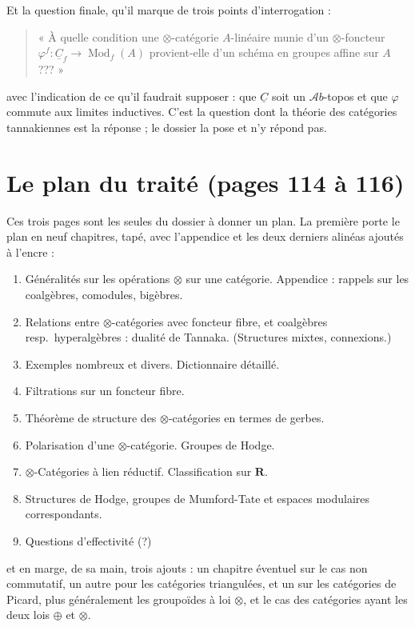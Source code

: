 \documentclass[11pt,a4paper]{article}
\begin{document}
Et la question finale, qu'il marque de trois points d'interrogation :
\begin{quote}
« À quelle condition une $\otimes$-catégorie $A$-linéaire munie d'un
$\otimes$-foncteur $\varphi^{f} \colon \underline{C}_{f} \to
\operatorname{Mod}_{f}(A)$ provient-elle d'un schéma en groupes affine sur $A$
??? »
\end{quote}
avec l'indication de ce qu'il faudrait supposer : que $\underline{C}$ soit un
$\mathcal{A}b$-topos et que $\varphi$ commute aux limites inductives. C'est la
question dont la théorie des catégories tannakiennes est la réponse ; le dossier
la pose et n'y répond pas.

\section*{Le plan du traité (pages 114 à 116)}

Ces trois pages sont les seules du dossier à donner un plan. La première porte
le plan en neuf chapitres, tapé, avec l'appendice et les deux derniers alinéas
ajoutés à l'encre :

\begin{enumerate}
\item Généralités sur les opérations $\otimes$ sur une catégorie. Appendice :
rappels sur les coalgèbres, comodules, bigèbres.
\item Relations entre $\otimes$-catégories avec foncteur fibre, et coalgèbres
resp.\ hyperalgèbres : dualité de Tannaka. (Structures mixtes, connexions.)
\item Exemples nombreux et divers. Dictionnaire détaillé.
\item Filtrations sur un foncteur fibre.
\item Théorème de structure des $\otimes$-catégories en termes de gerbes.
\item Polarisation d'une $\otimes$-catégorie. Groupes de Hodge.
\item $\otimes$-Catégories à lien réductif. Classification sur $\mathbf{R}$.
\item Structures de Hodge, groupes de Mumford-Tate et espaces modulaires
correspondants.
\item Questions d'effectivité (?)
\end{enumerate}
et en marge, de sa main, trois ajouts : un chapitre éventuel sur le cas non
commutatif, un autre pour les catégories triangulées, et un sur les catégories
de Picard, plus généralement les groupoïdes à loi $\otimes$, et le cas des
catégories ayant les deux lois $\oplus$ et $\otimes$.
\end{document}
